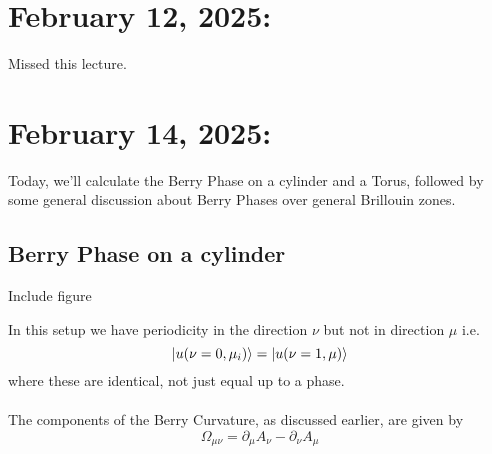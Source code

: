 \documentclass[11pt]{article}
\begin{document}
\pagebreak
\section{February 12, 2025:}

Missed this lecture.


\pagebreak
\section{February 14, 2025:}

Today, we'll calculate the Berry Phase on a cylinder and a Torus, followed by some general discussion about Berry Phases over general Brillouin zones.

\vskip 1cm
\subsection{Berry Phase on a cylinder}

\begin{center}
  Include figure
\end{center}

In this setup we have periodicity in the direction $\nu$ but not in direction $\mu$ i.e. $$ \lvert u(\nu = 0, \mu_i)\rangle = \lvert u(\nu = 1, \mu)\rangle $$ where these are identical, not just equal up to a phase.
\\
\\
The components of the Berry Curvature, as discussed earlier, are given by $$ \Omega_{\mu \nu} = \partial_{\mu} A_{\nu} - \partial_{\nu} A_{\mu} $$ 
\end{document}
